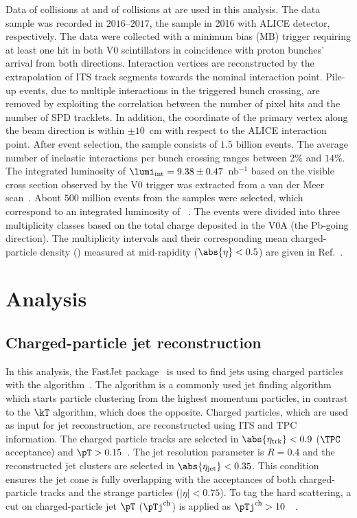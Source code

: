 \documentclass[ALICE,manyauthors]{cernphprep}
\begin{document}
Data of \pp collisions at \thirteen and of \pPb collisions at \fivenn are used in this analysis.
The \pp data sample was recorded in $2016$--$2017$, the \pPb sample in 2016 with ALICE detector, respectively.
The data were collected with a minimum bias (MB) trigger requiring at least one hit in both V0 scintillators in coincidence with proton bunches' arrival from both directions.
Interaction vertices are reconstructed by the extrapolation of ITS track segments towards the nominal interaction point.
Pile-up events, due to multiple interactions in the triggered bunch crossing, are removed by exploiting the correlation between the number of pixel hits and the number of SPD tracklets.
In addition, the coordinate of the primary vertex along the beam direction is within $\pm 10$~cm with respect to the ALICE interaction point.
After event selection, the \pp sample consists of $1.5$ billion events.
The average number of inelastic interactions per bunch crossing ranges between $2\%$ and $14\%$.
The integrated luminosity of $\lumi_{\rm int} = 9.38\pm 0.47$~nb$^{-1}$ based on the visible cross section observed by the V0 trigger was extracted from a van der Meer scan~\cite{ALICE-PUBLIC-2016-002}.
About $500$ million events from the \pPb samples were selected, which correspond to an integrated luminosity of ~\cite{collaboration_2014}.
The \pPb events were divided into three multiplicity classes based on the total charge deposited in the V0A (the Pb-going direction).
The multiplicity intervals and their corresponding mean charged-particle density (\dndeta) measured at mid-rapidity ($\abs{\eta} < 0.5$) are given in Ref.~\cite{Adam:2015pza}. 

\section{Analysis}%
\label{sec:Analysis}

\subsection{Charged-particle jet reconstruction}%
\label{sec:JetRec}

In this analysis, the FastJet package~\cite{Cacciari:2011ma} is used to find jets using charged particles with the \akT algorithm~\cite{Cacciari:2008gp}.
The \akT algorithm is a commonly used jet finding algorithm which starts particle clustering from the highest momentum particles, in contrast to the $\kT$ algorithm, which does the opposite.
Charged particles, which are used as input for jet reconstruction, are reconstructed using ITS and TPC information.
The charged particle tracks are selected in $\abs{\eta_{\rm trk}} < 0.9$ ($\TPC$ acceptance) and $\pT> 0.15$~\GeVc.
The jet resolution parameter is $R = 0.4$ and the reconstructed jet clusters are selected in $\abs{\eta_{\rm jet}} < 0.35$.
This condition ensures the jet cone is fully overlapping with the acceptances of both charged-particle tracks and the strange particles ($|\eta| < 0.75$).
To tag the hard scattering, a cut on charged-particle jet $\pT$ ($\pTj^{\rm ch}$) is applied as $\pTj^{\rm ch} > 10$~\GeVc~\cite{Acharya:2021oaa}.
\end{document}

